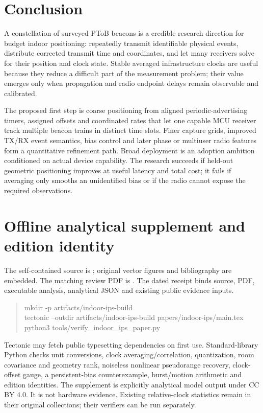 \documentclass[11pt,letterpaper]{article}
\begin{document}
\section{Conclusion}
A constellation of surveyed PToB beacons is a credible research direction for budget indoor positioning: repeatedly transmit identifiable physical events, distribute corrected transmit time and coordinates, and let many receivers solve for their position and clock state. Stable averaged infrastructure clocks are useful because they reduce a difficult part of the measurement problem; their value emerges only when propagation and radio endpoint delays remain observable and calibrated.

The proposed first step is coarse positioning from aligned periodic-advertising timers, assigned offsets and coordinated rates that let one capable MCU receiver track multiple beacon trains in distinct time slots. Finer capture grids, improved TX/RX event semantics, bias control and later phase or multiuser radio features form a quantitative refinement path. Broad deployment is an adoption ambition conditioned on actual device capability. The research succeeds if held-out geometric positioning improves at useful latency and total cost; it fails if averaging only smooths an unidentified bias or if the radio cannot expose the required observations.

\appendix
\section{Offline analytical supplement and edition identity}
The self-contained source is ; original vector figures and bibliography are embedded. The matching review PDF is . The dated receipt  binds source, PDF, executable analysis, analytical JSON and existing public evidence inputs.
\begin{quote}\small\ttfamily
mkdir -p artifacts/indoor-ips-build\\
tectonic --outdir artifacts/indoor-ips-build papers/indoor-ips/main.tex\\
python3 tools/verify\_indoor\_ips\_paper.py
\end{quote}
Tectonic may fetch public typesetting dependencies on first use. Standard-library Python checks unit conversions, clock averaging/correlation, quantization, room covariance and geometry rank, noiseless nonlinear pseudorange recovery, clock-offset gauge, a persistent-bias counterexample, burst/motion arithmetic and edition identities. The supplement  is explicitly analytical model output under CC BY 4.0. It is not hardware evidence. Existing relative-clock statistics remain in their original collections; their verifiers can be run separately.
\end{document}
